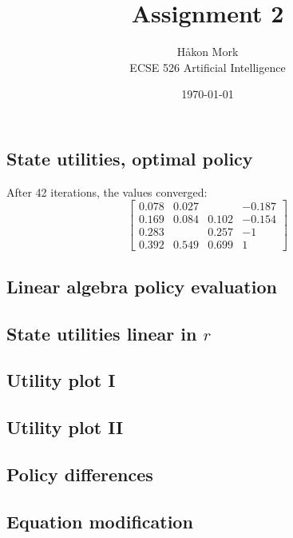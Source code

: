 \documentclass[letterpaper, 10pt, twocolumn]{article}
\title{\textbf{Assignment 2}}
\author{Håkon Mork \\ ECSE 526 Artificial Intelligence}
\date{\today}
\begin{document}
\maketitle
\noindent

\section{}
\subsection{State utilities, optimal policy}
After 42 iterations, the values converged:
\[
\begin{bmatrix}
0.078 & 0.027 &       & -0.187 \\
0.169 & 0.084 & 0.102 & -0.154 \\
0.283 &       & 0.257 & -1 \\
0.392 & 0.549 & 0.699 & 1
\end{bmatrix}
\]


\subsection{Linear algebra policy evaluation}

\subsection{State utilities linear in $r$}

\subsection{Utility plot I}

\subsection{Utility plot II}

\subsection{Policy differences}

\subsection{Equation modification}


\section{}
\end{document}
